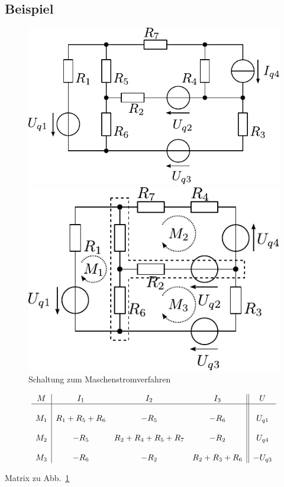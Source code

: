 \newpage

\subsection{Beispiel}
\begin{figure}[h!]
\centering
\includegraphics[scale=\schscale]{../fig/mastro_sch.pdf}

\vspace{5mm}

\includegraphics[scale=\schscale]{../fig/mastro_sch_2.pdf}
\caption{Schaltung zum Maschenstromverfahren}
\label{sch:mastro}
\end{figure}

\begin{table}[h!]
\footnotesize
\[ \begin{array}{c|ccc||c}

M	& I_1 & I_2 & I_3 & U \\
\hline &&&& \\
M_1 	& R_1 + R_5 + R_6 	& -R_5 				& -R_6 			& U_{q1} \\
&&&& \\
M_2 	& -R_5 			& R_2 + R_4 + R_5 + R_7 	& -R_2 			& U_{q4} \\
&&&& \\
M_3 	& -R_6 			& -R_2 				& R_2 + R_3 + R_6 	& -U_{q3} \\
\end{array}
\]
\normalsize
\caption{Matrix zu Abb.~\ref{sch:mastro}}
\end{table}
